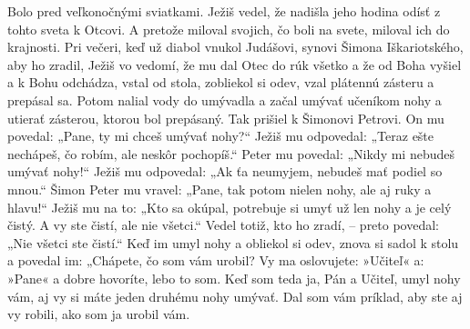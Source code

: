 Bolo pred veľkonočnými sviatkami. Ježiš vedel, že nadišla jeho hodina odísť z tohto sveta k Otcovi. A pretože miloval svojich, čo boli na svete, miloval ich do krajnosti. 
\versseparator
Pri večeri, keď už diabol vnukol Judášovi, synovi Šimona Iškariotského, aby ho zradil, Ježiš vo vedomí, že mu dal Otec do rúk všetko a že od Boha vyšiel a k Bohu odchádza, vstal od stola, zobliekol si odev, vzal plátennú zásteru a prepásal sa. Potom nalial vody do umývadla a začal umývať učeníkom nohy a utierať zásterou, ktorou bol prepásaný. 
\versseparator
Tak prišiel k Šimonovi Petrovi. On mu povedal: „Pane, ty mi chceš umývať nohy?“ Ježiš mu odpovedal: „Teraz ešte nechápeš, čo robím, ale neskôr pochopíš.“ Peter mu povedal: „Nikdy mi nebudeš umývať nohy!“ Ježiš mu odpovedal: „Ak ťa neumyjem, nebudeš mať podiel so mnou.“ Šimon Peter mu vravel: „Pane, tak potom nielen nohy, ale aj ruky a hlavu!“ Ježiš mu na to: „Kto sa okúpal, potrebuje si umyť už len nohy a je celý čistý. A vy ste čistí, ale nie všetci.“ Vedel totiž, kto ho zradí, – preto povedal: „Nie všetci ste čistí.“
\versseparator
Keď im umyl nohy a obliekol si odev, znova si sadol k stolu a povedal im: „Chápete, čo som vám urobil? Vy ma oslovujete: »Učiteľ« a: »Pane« a dobre hovoríte, lebo to som. Keď som teda ja, Pán a Učiteľ, umyl nohy vám, aj vy si máte jeden druhému nohy umývať. 
Dal som vám príklad, aby ste aj vy robili, ako som ja urobil vám. 